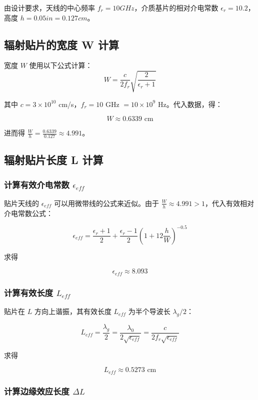 \documentclass[12pt,a4paper,UTF8]{article}
\begin{document}
由设计要求，天线的中心频率 $f_r = 10GHz$，介质基片的相对介电常数 $\epsilon_r = 10.2$，高度 $h = 0.05 in = 0.127 cm$。

\subsection{辐射贴片的宽度 W 计算}

宽度 $W$ 使用以下公式计算：
$$ W = \frac{c}{2f_r}\sqrt{\frac{2}{\epsilon_r+1}} $$

其中 $c = 3\times10^{10}$ cm/s，$f_r = 10$ GHz $= 10\times10^9$ Hz。代入数据，得：

$$ W  \approx 0.6339 \text{ cm} $$

进而得 $\frac{W}{h} = \frac{0.6339}{0.127} \approx 4.991$。

\subsection{辐射贴片长度 L 计算}

\subsubsection{计算有效介电常数 $\epsilon_{eff}$}

贴片天线的 $\epsilon_{eff}$ 可以用微带线的公式来近似。由于 $\frac{W}{h} \approx 4.991 > 1$，代入有效相对介电常数公式：

$$ \epsilon_{eff} = \frac{\epsilon_r+1}{2} + \frac{\epsilon_r-1}{2}\left(1+12\frac{h}{W}\right)^{-0.5} $$

求得

$$ \epsilon_{eff} \approx 8.093 $$

\subsubsection{计算有效长度 $L_{eff}$}

贴片在 $L$ 方向上谐振，其有效长度 $L_{eff}$ 为半个导波长 $\lambda_g/2$：

$$ L_{eff} = \frac{\lambda_g}{2} = \frac{\lambda_0}{2\sqrt{\epsilon_{eff}}} = \frac{c}{2f_r\sqrt{\epsilon_{eff}}} $$

求得

$$ L_{eff} \approx 0.5273 \text{ cm} $$

\subsubsection{计算边缘效应长度 $\Delta L$}
\end{document}

